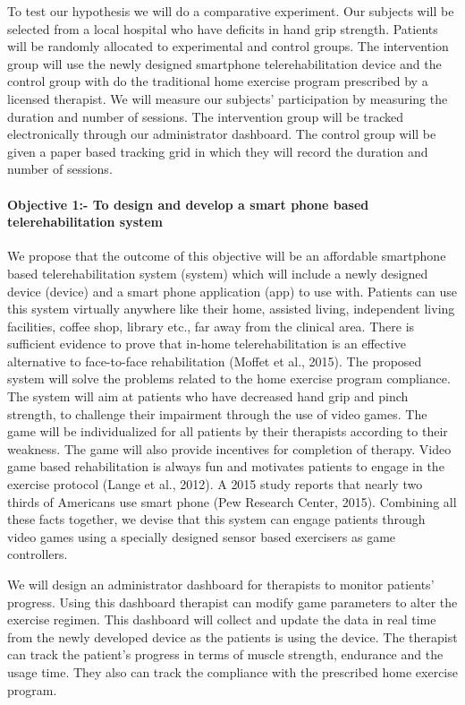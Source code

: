 \documentclass[12pt]{article}
\begin{document}
 To test our hypothesis we will do a comparative experiment. Our subjects will be selected from a local hospital who have deficits in hand grip strength. Patients will be randomly allocated to experimental and control groups. The intervention group will use the newly designed smartphone telerehabilitation device and the control group with do the traditional home exercise program prescribed by a licensed therapist. We will measure our subjects' participation by measuring the duration and number of sessions. The intervention group will be tracked electronically through our administrator dashboard. The control group will be given a paper based tracking grid in which they will record the duration and number of sessions. 
 

\paragraph{Objective 1:- To design and develop a smart phone based telerehabilitation system } 

We propose that the outcome of this objective will be an affordable smartphone based telerehabilitation system (system) which will include a newly designed device (device) and a smart phone application (app) to use  with.  Patients can use this system virtually anywhere like their home, assisted living, independent living facilities, coffee shop, library etc., far away from the clinical area. There is sufficient evidence to prove that in-home telerehabilitation is an effective alternative to face-to-face rehabilitation (Moffet et al., 2015). The proposed system will solve the problems related to the  home exercise program compliance. The system will aim at patients who have decreased hand grip and pinch strength, to challenge their impairment through the use of video games. The game will be individualized for all patients by their therapists according to their weakness.  The game will also provide incentives for completion of therapy. Video game based rehabilitation is always fun and motivates patients to engage in the exercise protocol (Lange et al., 2012). A 2015 study reports that nearly two thirds of Americans use smart phone (Pew Research Center, 2015). Combining all these facts together, we devise that this system can engage patients through video games using a specially designed sensor based exercisers as game controllers. 

We will design an administrator dashboard for therapists to monitor patients' progress. Using this dashboard therapist can modify game parameters to alter the exercise regimen. This dashboard will collect and update the data  in real time from the newly developed device as the patients is using the device. The therapist can track the patient's progress in terms of muscle strength, endurance and the usage time. They also can track  the compliance with the prescribed home exercise program.  
\end{document}
